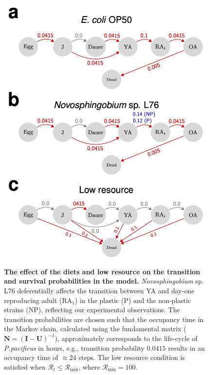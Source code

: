 \documentclass[10pt,letterpaper]{article}
\newcommand{\novo}{\emph{Novosphingobium} sp. L76}
\begin{document}
\begin{figure}
\begin{adjustwidth}{-2in}{0in}
    \begin{flushright}
\includegraphics[width=130mm]{figures/figureS1.jpg}
\caption{\textbf{The effect of the diets and low resource on the transition and survival probabilities in the model.} \novo{} deferentially affects the transition between YA and day-one reproducing adult (RA$_1$) in the plastic (P) and the non-plastic strains (NP), reflecting our experimental observations. The transition probabilities are chosen such that the occupancy time in the Markov chain, calculated using the fundamental matrix ($\mathbf{N} = (\mathbf{I} - \mathbf{U})^{-1}$), approximately corresponds to the life-cycle of \emph{P.pacificus} in hours, e.g., transition probability $0.0415$ results in an occupancy time of $\approx 24$ steps. The low resource condition is satisfied when $\mathcal{R}_t \leq \mathcal{R}_\mathrm{min}$, where $\mathcal{R}_\mathrm{min} = 100$.}
\label{fig:figs1}
\end{flushright}
\end{adjustwidth}
\end{figure}
\end{document}
